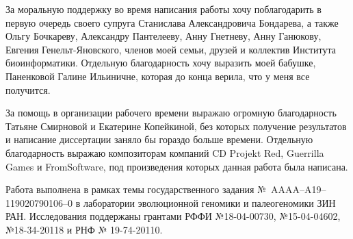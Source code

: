 За моральную поддержку во время написания работы хочу поблагодарить в первую очередь своего супруга Станислава Александровича Бондарева, а также Ольгу Бочкареву, Александру Пантелееву, Анну Гнетневу, Анну Ганюкову, Евгения Генельт-Яновского, членов моей семьи, друзей и коллектив Института биоинформатики. Отдельную благодарность хочу выразить моей бабушке, Паненковой Галине Ильиничне, которая до конца верила, что у меня все получится. 

За помощь в организации рабочего времени выражаю огромную благодарность Татьяне Смирновой и Екатерине Копейкиной, без которых получение результатов и написание диссертации заняло бы гораздо больше времени. Отдельную благодарность выражаю композиторам компаний CD Projekt Red, Guerrilla Games и FromSoftware, под произведения которых данная работа была написана. 

Работа выполнена в рамках темы государственного задания №~AAAA–A19–119020790106–0 в лаборатории эволюционной геномики и палеогеномики ЗИН РАН. Исследования поддержаны грантами РФФИ №18-04-00730, №15-04-04602, №18-34-20118 и РНФ № 19-74-20110.

\newpage